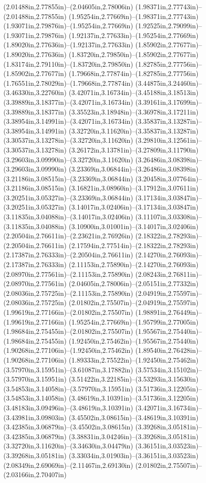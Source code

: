 (2.01488in,2.77855in)--(2.04605in,2.78006in) (1.98371in,2.77743in)--(2.01488in,2.77855in) (1.95254in,2.77669in)--(1.98371in,2.77743in) (1.93071in,2.79876in)--(1.95254in,2.77669in) (1.92525in,2.79099in)--(1.93071in,2.79876in) (1.92137in,2.77633in)--(1.95254in,2.77669in) (1.89020in,2.77636in)--(1.92137in,2.77633in) (1.85902in,2.77677in)--(1.89020in,2.77636in) (1.83720in,2.79850in)--(1.85902in,2.77677in) (1.83174in,2.79110in)--(1.83720in,2.79850in) (1.82785in,2.77756in)--(1.85902in,2.77677in) (1.79668in,2.77874in)--(1.82785in,2.77756in) (1.76551in,2.78029in)--(1.79668in,2.77874in) (3.44875in,3.24460in)--(3.46330in,3.22760in) (3.42071in,3.16734in)--(3.45188in,3.18513in) (3.39889in,3.18377in)--(3.42071in,3.16734in) (3.39161in,3.17699in)--(3.39889in,3.18377in) (3.35523in,3.18948in)--(3.36978in,3.17211in) (3.38954in,3.14991in)--(3.42071in,3.16734in) (3.35837in,3.13287in)--(3.38954in,3.14991in) (3.32720in,3.11620in)--(3.35837in,3.13287in) (3.30537in,3.13278in)--(3.32720in,3.11620in) (3.29810in,3.12561in)--(3.30537in,3.13278in) (3.26172in,3.13781in)--(3.27809in,3.11790in) (3.29603in,3.09990in)--(3.32720in,3.11620in) (3.26486in,3.08398in)--(3.29603in,3.09990in) (3.23369in,3.06844in)--(3.26486in,3.08398in) (3.21186in,3.08515in)--(3.23369in,3.06844in) (3.20458in,3.07764in)--(3.21186in,3.08515in) (3.16821in,3.08960in)--(3.17912in,3.07611in) (3.20251in,3.05327in)--(3.23369in,3.06844in) (3.17134in,3.03847in)--(3.20251in,3.05327in) (3.14017in,3.02406in)--(3.17134in,3.03847in) (3.11835in,3.04088in)--(3.14017in,3.02406in) (3.11107in,3.03308in)--(3.11835in,3.04088in) (3.10900in,3.01001in)--(3.14017in,3.02406in) (2.20504in,2.76611in)--(2.23621in,2.76926in) (2.18322in,2.78293in)--(2.20504in,2.76611in) (2.17594in,2.77514in)--(2.18322in,2.78293in) (2.17387in,2.76333in)--(2.20504in,2.76611in) (2.14270in,2.76093in)--(2.17387in,2.76333in) (2.11153in,2.75890in)--(2.14270in,2.76093in) (2.08970in,2.77561in)--(2.11153in,2.75890in) (2.08243in,2.76811in)--(2.08970in,2.77561in) (2.04605in,2.78006in)--(2.05151in,2.77332in) (2.08036in,2.75725in)--(2.11153in,2.75890in) (2.04919in,2.75597in)--(2.08036in,2.75725in) (2.01802in,2.75507in)--(2.04919in,2.75597in) (1.99619in,2.77166in)--(2.01802in,2.75507in) (1.98891in,2.76449in)--(1.99619in,2.77166in) (1.95254in,2.77669in)--(1.95799in,2.77005in) (1.98684in,2.75455in)--(2.01802in,2.75507in) (1.95567in,2.75440in)--(1.98684in,2.75455in) (1.92450in,2.75462in)--(1.95567in,2.75440in) (1.90268in,2.77106in)--(1.92450in,2.75462in) (1.89540in,2.76428in)--(1.90268in,2.77106in) (1.89333in,2.75522in)--(1.92450in,2.75462in) (3.57970in,3.15951in)--(3.61087in,3.17882in) (3.57534in,3.15102in)--(3.57970in,3.15951in) (3.51422in,3.22185in)--(3.53293in,3.15630in) (3.54853in,3.14058in)--(3.57970in,3.15951in) (3.51736in,3.12205in)--(3.54853in,3.14058in) (3.48619in,3.10391in)--(3.51736in,3.12205in) (3.48183in,3.09496in)--(3.48619in,3.10391in) (3.42071in,3.16734in)--(3.43981in,3.09803in) (3.45502in,3.08615in)--(3.48619in,3.10391in) (3.42385in,3.06879in)--(3.45502in,3.08615in) (3.39268in,3.05181in)--(3.42385in,3.06879in) (3.38831in,3.04246in)--(3.39268in,3.05181in) (3.32720in,3.11620in)--(3.34630in,3.04479in) (3.36151in,3.03523in)--(3.39268in,3.05181in) (3.33034in,3.01903in)--(3.36151in,3.03523in) (2.08349in,2.69069in)--(2.11467in,2.69130in) (2.01802in,2.75507in)--(2.03166in,2.70407in) 